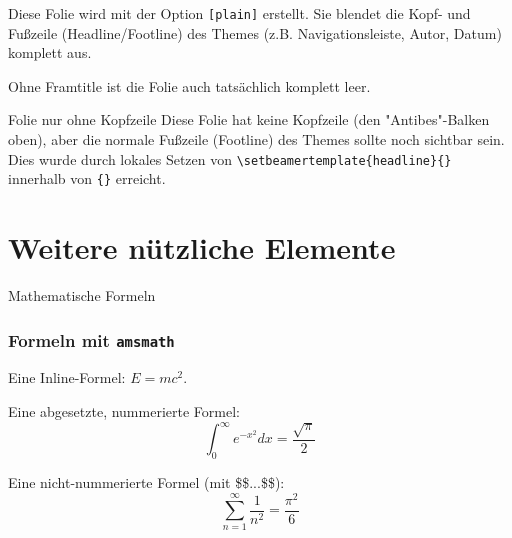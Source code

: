 \documentclass[12pt, aspectratio=169]{beamer}
\begin{document}
\begin{frame}[plain]
    Diese Folie wird mit der Option \texttt{[plain]} erstellt.
    Sie blendet die Kopf- und Fußzeile (Headline/Footline) des Themes 
    (z.B. Navigationsleiste, Autor, Datum) komplett aus.
    
    \vfill
    \begin{center}
    \Huge Ohne Framtitle ist die Folie auch tatsächlich komplett leer.
    \end{center}
    \vfill
    
\end{frame}

{ %
    \begin{frame}{Folie nur ohne Kopfzeile}
        Diese Folie hat keine Kopfzeile (den "Antibes"-Balken oben), 
        aber die normale Fußzeile (Footline) des Themes sollte noch sichtbar sein.
        \vfill
        Dies wurde durch lokales Setzen von 
        \texttt{\textbackslash setbeamertemplate\{headline\}\{\}}
        innerhalb von \texttt{\{\}} erreicht.
    \end{frame}
} %

\section{Weitere nützliche Elemente}

\begin{frame}{Mathematische Formeln}
    \frametitle{Formeln mit \texttt{amsmath}}
    
    Eine Inline-Formel: $E = mc^2$.
    
    Eine abgesetzte, nummerierte Formel:
    \begin{equation}
        \int_0^\infty e^{-x^2} dx = \frac{\sqrt{\pi}}{2}
    \end{equation}
    
    Eine nicht-nummerierte Formel (mit \$\$...\$\$):
    $$ \sum_{n=1}^\infty \frac{1}{n^2} = \frac{\pi^2}{6} $$
\end{frame}
\end{document}

